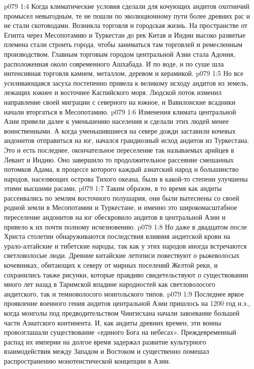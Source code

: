 \vs p079 1:4 Когда климатические условия сделали для кочующих андитов охотничий промысел невыгодным, те не пошли по эволюционному пути более древних рас и не стали скотоводами. Возникла торговля и городская жизнь. На пространстве от Египта через Месопотамию и Туркестан до рек Китая и Индии высоко развитые племена стали строить города, чтобы заниматься там торговлей и ремесленным производством. Главным торговым городом центральной Азии стала Адония, расположенная около современного Ашхабада. И по воде, и по суше шла интенсивная торговля камнем, металлом, деревом и керамикой.
\vs p079 1:5 Но все усиливающаяся засуха постепенно привела к великому исходу андитов из земель, лежащих южнее и восточнее Каспийского моря. Людской поток изменил направление своей миграции с северного на южное, и Вавилонские всадники начали вторгаться в Месопотамию.
\vs p079 1:6 Изменения климата центральной Азии привели далее к уменьшению населения и сделали этих людей менее воинственными. А когда уменьшившиеся на севере дожди заставили кочевых андонитов отправиться на юг, начался грандиозный исход андитов из Туркестана. Это и есть последнее, окончательное переселение так называемых арийцев в Левант и Индию. Оно завершило то продолжительное рассеяние смешанных потомков Адама, в процессе которого каждый азиатский народ и большинство народов, населяющих острова Тихого океана, были в какой\hyp{}то степени улучшены этими высшими расами.
\vs p079 1:7 Таким образом, в то время как андиты рассеивались по землям восточного полушария, они были вытеснены со своей родной земли в Месопотамии и Туркестане, и именно это широкомасштабное переселение андонитов на юг обескровило андитов в центральной Азии и привело к их почти полному исчезновению.
\vs p079 1:8 Но даже в двадцатом после Христа столетии обнаруживаются последствия влияния андитской крови на урало\hyp{}алтайские и тибетские народы, так как у этих народов иногда встречаются светловолосые люди. Древние китайские летописи повествуют о рыжеволосых кочевниках, обитающих к северу от мирных поселений Желтой реки, и сохранились также рисунки, которые правдиво свидетельствуют о существовании много лет назад в Таримской впадине народностей как светловолосого андитского, так и темноволосого монгольского типов.
\vs p079 1:9 Последнее яркое проявление военного гения андитов центральной Азии пришлось на 1200 год н.э., когда монголы под предводительством Чингисхана начали завоевание большей части Азиатского континента. И, как андиты древних времен, эти воины провозглашали существование «единого Бога на небесах». Преждевременный распад их империи на долгое время задержал развитие культурного взаимодействия между Западом и Востоком и существенно помешал распространению монотеистической концепции в Азии.
